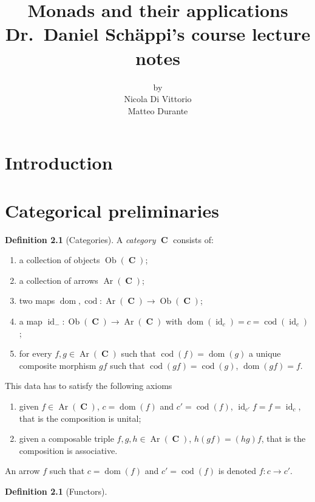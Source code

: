 \documentclass[a4paper,11pt,twoside, openany]{book}
\DeclareMathOperator{\C}{\mathbf{C}}
\DeclareMathOperator{\id}{id}
\DeclareMathOperator{\dom}{dom}
\DeclareMathOperator{\cod}{cod}
\DeclareMathOperator{\Ob}{Ob}
\DeclareMathOperator{\Ar}{Ar}
\theoremstyle{definition}
\theoremstyle{definition}
\newtheorem{defn}[thm]{Definition} %
\theoremstyle{remark}
\begin{document}
	\doclicenseThis
	\author{by \\
		Nicola Di Vittorio \\ Matteo Durante}
	\title{\huge Monads and their applications \\
		\vspace*{5mm}
		\large Dr.\ Daniel Schäppi's course lecture notes} 
	\date{}
	
	\frontmatter
	\maketitle
	\tableofcontents
	
	\chapter{Introduction}
	
	\mainmatter
	
	\chapter{Categorical preliminaries}
	\begin{defn}[Categories]
		A \emph{category} $\C$ consists of:
		\begin{enumerate}
			\item a collection of objects $\Ob(\C)$;
			\item a collection of arrows $\Ar(\C)$;
			\item two maps $\dom,\cod\colon\Ar(\C)\rightarrow\Ob(\C)$;
			\item a map $\id_{-}\colon\Ob(\C)\rightarrow\Ar(\C)$ with $\dom(\id_{c})=c=\cod(\id_{c})$;
			\item for every $f,g\in\Ar(\C)$ such that $\cod(f)=\dom(g)$ a unique composite morphism $gf$ such that $\cod(gf)=\cod(g)$, $\dom(gf)=f$.
		\end{enumerate}
		This data has to satisfy the following axioms
		\begin{enumerate}
			\item given $f\in\Ar(\C)$, $c=\dom(f)$ and $c'=\cod(f)$, $\id_{c'}f=f=\id_{c}$, that is the composition is unital;
			\item given a composable triple $f,g,h\in\Ar(\C)$, $h(gf)=(hg)f$, that is the composition is associative.
		\end{enumerate}
		An arrow $f$ such that $c=\dom(f)$ and $c'=\cod(f)$ is denoted $f\colon c\rightarrow c'$.
	\end{defn}
	
	\begin{defn}[Functors]
		
	\end{defn}
	
\end{document}
